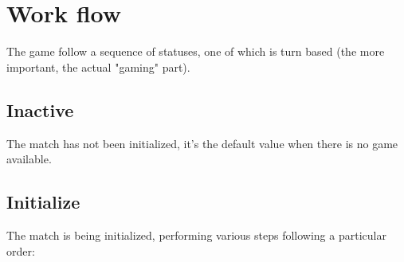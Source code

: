 	\section{Work flow}
	\label{workflow:general}
		
		The game follow a sequence of statuses, one of which is turn based (the more important, the actual "gaming" part).
	
		\subsection{Inactive}
		
			The match has not been initialized, it's the default value when there is no game available.
	
		\subsection{Initialize}
		
			The match is being initialized, performing various steps following a particular order:
			
